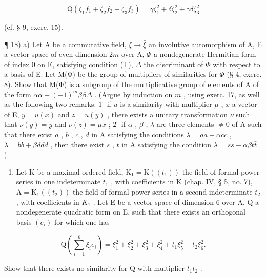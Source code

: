 \[
\mathrm{Q} \left(\zeta_ {1} f _ {1} + \zeta_ {2} f _ {2} + \zeta_ {3} f _ {3}\right) = \gamma \zeta_ {1} ^ {2} + \delta \zeta_ {2} ^ {2} + \gamma \delta \zeta_ {3} ^ {2}
\]

(cf. § 9, exerc. 15).

¶ 18) a) Let A be a commutative field, \(\xi \to \bar{\xi}\) an involutive automorphism of A, E a vector space of even dimension \(2m\) over A, \(\Phi\) a nondegenerate Hermitian form of index 0 on E, satisfying condition (T), \(\Delta\) the discriminant of \(\Phi\) with respect to a basis of E. Let M(Φ) be the group of multipliers of similarities for \(\Phi\) (§ 4, exerc. 8). Show that M(Φ) is a subgroup of the multiplicative group of elements of A of the form \(\alpha\bar{\alpha} - (-1)^{m}\beta\bar{\beta}\Delta\) . (Argue by induction on \(m\) , using exerc. 17, as well as the following two remarks: \(1^{\circ}\) if \(u\) is a similarity with multiplier \(\mu\) , \(x\) a vector of E, \(y = u(x)\) and \(z = u(y)\) , there exists a unitary transformation \(\nu\) such that \(\nu(y) = y\) and \(\nu(z) = \mu x\) ; \(2^{\circ}\) if \(\alpha\) , \(\beta\) , \(\lambda\) are three elements \(\neq 0\) of A such that there exist \(a\) , \(b\) , \(c\) , \(d\) in A satisfying the conditions \(\lambda = a\bar{a} + \alpha c\bar{c}\) , \(\lambda = b\bar{b} + \beta dd\bar{d}\) , then there exist \(s\) , \(t\) in A satisfying the condition \(\lambda = s\bar{s} - \alpha\beta t\bar{t}\) ).

\begin{enumerate}
\def\labelenumi{\alph{enumi})}
\setcounter{enumi}{1}
\tightlist
\item
  Let K be a maximal ordered field, \(\mathrm{K}_{1} = \mathrm{K}((t_{1}))\) the field of formal power series in one indeterminate \(t_{1}\) , with coefficients in K (chap. IV, § 5, no. 7), \(\mathrm{A} = \mathrm{K}_{1}((t_{2}))\) the field of formal power series in a second indeterminate \(t_{2}\) , with coefficients in \(K_{1}\) . Let E be a vector space of dimension 6 over A, Q a nondegenerate quadratic form on E, such that there exists an orthogonal basis \((e_{i})\) for which one has
\end{enumerate}

\[
\mathrm{Q} (\sum_ {i = 1} ^ {6} \xi_ {i} e _ {i}) = \xi_ {1} ^ {2} + \xi_ {2} ^ {2} + \xi_ {3} ^ {2} + \xi_ {4} ^ {2} + t _ {1} \xi_ {5} ^ {2} + t _ {2} \xi_ {6} ^ {2}.
\]

Show that there exists no similarity for Q with multiplier \(t_{1}t_{2}\) .


